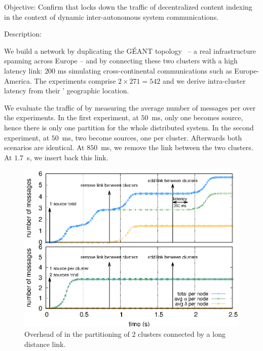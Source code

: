 \begin{asparadesc}

\item [Objective:] Confirm that \NAME locks down the traffic of decentralized content
  indexing in the context of dynamic inter-autonomous system
  communications.
  
\item [Description:]

We build a network by duplicating the G{\'E}ANT
topology~\cite{knight2011internet} -- a real infrastructure spanning
across Europe -- and by connecting these two clusters with a high
latency link: $200$ ms simulating cross-continental communications
such as Europe-America. The experiments comprise $2 \times 271 = 542$
\processes and we derive intra-cluster latency from their \processes'
geographic location.

\noindent We evaluate the traffic of \NAME by measuring the average
number of messages per \process over the experiments. In the first
experiment, at $50$~ms, only one \process becomes source, hence there
is only one partition for the whole distributed system. In the second
experiment, at $50$~ms, two \processes become sources, one per
cluster. Afterwards both scenarios are identical. At $850$~ms, we
remove the link between the two clusters. At $1.7$~s, we insert back this
link.

\begin{figure}
  \centering\includegraphics[width=\FIGSCALE\columnwidth]{img/as_cast_geant.eps}
  \caption{\label{fig:geant}Overhead of \NAME in the partitioning of 2 clusters connected by a long distance link.}
\end{figure}


\end{asparadesc}
